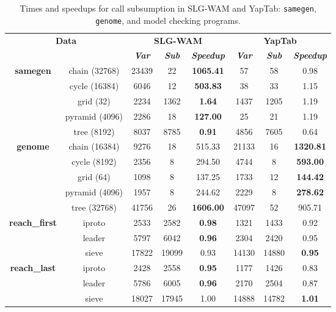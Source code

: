 \begin{table}[ht]
\centering
\footnotesize{
  \begin{tabular}{cc|ccc|ccc}
   \hline
    \hline
    \multicolumn{2}{c|}{\multirow{2}{*}{\small{\textbf{Data}}}} & \multicolumn{3}{c|}{\small{\textbf{SLG-WAM}}} & \multicolumn{3}{c}{\small{\textbf{YapTab}}} \\
     \multicolumn{2}{c|}{} & \textbf{\textit{Var}} & \textbf{\textit{Sub}} & \textbf{\textit{Speedup}} & \textbf{\textit{Var}} & \textbf{\textit{Sub}} & \textbf{\textit{Speedup}} \\
   \hline
   \hline
   \multirow{5}{*}{\textbf{samegen}} &  \scriptsize{chain  (32768) }  &  23439 & 22 &  \textbf{1065.41}  & 57 & 58 &  0.98 \\
   &  \scriptsize{cycle  (16384) }  &  6046 & 12 &  \textbf{503.83}  & 38 & 33 &  1.15 \\
   &  \scriptsize{grid  (32) }  &  2234 & 1362 &  \textbf{1.64}  & 1437 & 1205 &  1.19 \\
   &  \scriptsize{pyramid  (4096) }  &  2286 & 18 &  \textbf{127.00}  & 25 & 21 &  1.19 \\
   &  \scriptsize{tree  (8192) }  &  8037 & 8785 &  \textbf{0.91}  & 4856 & 7605 &  0.64 \\
   \hline
   
   \multirow{5}{*}{\textbf{genome}} &  \scriptsize{chain  (16384) }  &  9276 & 18 &  515.33  & 21133 & 16 &  \textbf{1320.81} \\
   &  \scriptsize{cycle  (8192) }  &  2356 & 8 &  294.50  & 4744 & 8 &  \textbf{593.00} \\
   &  \scriptsize{grid  (64) }  &  1098 & 8 &  137.25  & 1733 & 12 &  \textbf{144.42} \\
   &  \scriptsize{pyramid  (4096) }  &  1957 & 8 &  244.62  & 2229 & 8 &  \textbf{278.62} \\
   &  \scriptsize{tree  (32768) }  &  41756 & 26 &  \textbf{1606.00}  & 47097 & 52 &  905.71 \\
   \hline

   \multirow{3}{*}{\textbf{reach\_first}} &  \scriptsize{iproto}  &  2533 & 2582 &  \textbf{0.98}  & 1321 & 1433 &  0.92 \\
   &  \scriptsize{leader}  &  5797 & 6042 &  \textbf{0.96}  & 2304 & 2420 &  0.95 \\
   &  \scriptsize{sieve}  &  17822 & 19099 &  0.93  & 14130 & 14880 &  \textbf{0.95} \\
   \hline
   \multirow{3}{*}{\textbf{reach\_last}} &  \scriptsize{iproto}  &  2428 & 2558 &  \textbf{0.95}  & 1177 & 1426 &  0.83 \\
   &  \scriptsize{leader}  &  5786 & 6005 &  \textbf{0.96}  & 2170 & 2504 &  0.87 \\
   &  \scriptsize{sieve}  &  18027 & 17945 &  1.00  & 14888 & 14782 &  \textbf{1.01} \\
   \hline
\hline
\end{tabular}
}
\caption{Times and speedups for call subsumption in SLG-WAM and YapTab: \texttt{samegen}, \texttt{genome}, and model checking programs.}
\label{tbl:result_detail_others}
\end{table}